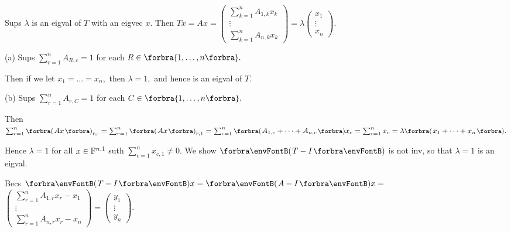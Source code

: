 \vspace{-8pt}\par\quad
Sups $\lambda$ is an eigval of $T$ with an eigvec $x.$ Then $Tx=Ax={}${\normalsize$\begin{pmatrix} \sum_{k=1}^n A_{1,k}x_k\\ \vdots\\ \sum_{k=1}^n A_{n,k}x_k\end{pmatrix}$}${}=\lambda ${\normalsize$\begin{pmatrix} x_1\\ \vdots\\ x_n\end{pmatrix}$}.\vspace{-6pt}\par\quad
(a) Sups $\sum_{r=1}^n A_{R,c}=1$ for each $R\in\Bra{1,\dots,n}.$\par\quad\Ha
Then if we let $x_1=\dots=x_n,$ then $\lambda=1,$ and hence is an eigval of $T.$\par\vspace{10pt}\quad
(b) Sups $\sum_{r=1}^n A_{r,C}=1$ for each $C\in\Bra{1,\dots,n}.$\vspace{4pt}\par\quad\Hb
Then $\sum_{r=1}^n \BigPar{Ax}_{r,\cdot}=\sum_{r=1}^n \BigPar{Ax}_{r,1}=\sum_{c=1}^n\BigPar{A_{1,c}+\dots+A_{n,c}}x_c=\sum_{c=1}^n x_c=\lambda\BigPar{x_1+\dots+x_n}.$\vspace{4pt}\par\quad\Hb
Hence $\lambda=1$ for all $x\in{\mathbb{F}}^{n,1}$ suth $\sum_{c=1}^n x_{c,1}\neq 0.$\PfEnd\vspace{10pt}\quad\Hb
\Or We show $\Par{T-I}$ is not inv, so that $\lambda=1$ is an eigval.\vspace{2pt}\par\quad\Hb
Becs $\Par{T-I}x=\Par{A-I}x={}${\small$\begin{pmatrix} \sum_{r=1}^n A_{1,r}x_r-x_1\\ \vdots\\ \sum_{r=1}^n A_{n,r}x_r-x_n\end{pmatrix}=\begin{pmatrix} y_1\\ \vdots\\ y_n\end{pmatrix}$}.\vspace{4pt}\par\quad\Hb

